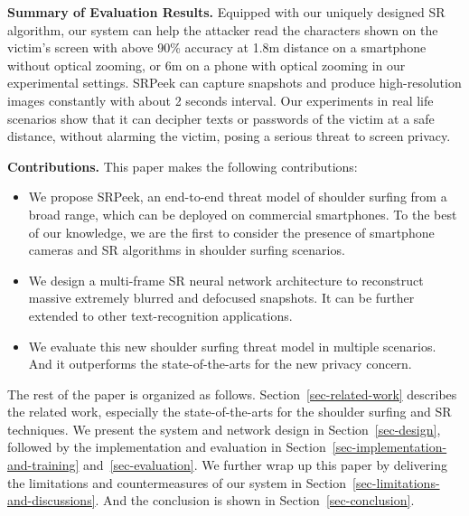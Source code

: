 \vspace{1mm}
\noindent
\textbf{Summary of Evaluation Results.}
Equipped with our uniquely designed SR algorithm, our system can help the attacker read the characters shown on the victim's screen with above 90\% accuracy at 1.8m distance on a smartphone without optical zooming, or 6m on a phone with optical zooming in our experimental settings. \textsf{SRPeek} can capture snapshots and produce high-resolution images constantly with about 2 seconds interval. Our experiments in real life scenarios show that it can decipher texts or passwords of the victim at a safe distance, without alarming the victim, posing a serious threat to screen privacy.

\vspace{1mm}
\noindent
\textbf{Contributions.} This paper makes the following contributions:
\begin{itemize}[leftmargin=*]
  \item	We propose \textsf{SRPeek}, an end-to-end threat model of shoulder surfing from a broad range, which can be deployed on commercial smartphones. To the best of our knowledge, we are the first to consider the presence of smartphone cameras and SR algorithms in shoulder surfing scenarios.
  \item	We design a multi-frame SR neural network architecture to reconstruct massive extremely blurred and defocused snapshots. It can be further extended to other text-recognition applications.
  \item	We evaluate this new shoulder surfing threat model in multiple scenarios. And it outperforms the state-of-the-arts for the new privacy concern.
\end{itemize}

The rest of the paper is organized as follows. Section~\ref{sec-related-work} describes the related work, especially the state-of-the-arts for the shoulder surfing and SR techniques. We present the system and network design in Section~\ref{sec-design}, followed by the implementation and evaluation in Section~\ref{sec-implementation-and-training} and~\ref{sec-evaluation}. We further wrap up this paper by delivering the limitations and countermeasures of our system in Section~\ref{sec-limitations-and-discussions}. And the conclusion is shown in Section~\ref{sec-conclusion}.
